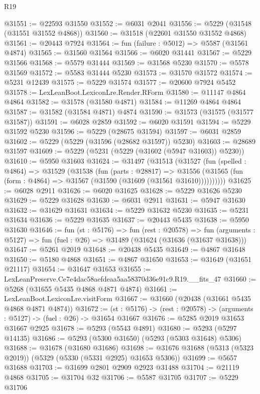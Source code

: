 \begin{lexlean}{R19}
\begin{coremodule}
@31551 := @22593 @31550
@31552 := @6031 @2041
@31556 := @5229 (@31548 (@31551 @31552 @4868))
@31560 := @31518 (@22601 @31550 @31552 @4868)
@31561 := @20443 @7924
@31564 := fun (failure : @5012) => @5587 (@31561 @4874)
@31565 := @31560 @31564
@31566 := @6020 @31441
@31567 := @5229 @31566
@31568 := @5579 @31444
@31569 := @31568 @5230
@31570 := @5578 @31569
@31572 := @5583 @31444 @5230
@31573 := @31570 @31572
@31574 := @5231 @12439
@31575 := @5229 @31574
@31577 := @20600 @7924 @5452
@31578 := LexLeanBoot.LexiconLre.Render.RForm
@31580 := @11147 @4864 @4864
@31582 := @31578 (@31580 @4871)
@31584 := @11269 @4864 @4864
@31587 := @31582 (@31584 @4871) @4874
@31590 := @31573 (@31575 (@31577 @31587))
@31591 := @6028 @2859
@31592 := @6020 @31591
@31594 := @5229 @31592 @5230
@31596 := @5229 (@28675 @31594)
@31597 := @6031 @2859
@31602 := @5229 (@5229 (@31596 (@28682 @31597)) @5230)
@31603 := @28689 @31597
@31609 := @5229 (@5231 (@5229 (@31602 (@5947 @31603)) @5230))
@31610 := @5950 @31603
@31624 := @31497
    (@31513
      (@31527
        (fun (spelled : @4864) =>
        @31529
          (@31538
            (fun (parts : @28817) =>
            @31556 (@31565 (fun (form : @4864) => @31567 (@31590 (@31609 (@31561 @31610))))))))))
@31625 := @6028 @2911
@31626 := @6020 @31625
@31628 := @5229 @31626 @5230
@31629 := @5229 @31628
@31630 := @6031 @2911
@31631 := @5947 @31630
@31632 := @31629 @31631
@31634 := @5229 @31632 @5230
@31635 := @5231 @31634
@31636 := @5229 @31635
@31637 := @20443 @5435
@31638 := @5950 @31630
@31646 := fun (st : @5176) =>
  fun (rest : @20578) =>
  fun (arguments : @5127) => fun (fuel : @26) => @31489 (@31624 (@31636 (@31637 @31638)))
@31647 := @5261 @2019
@31648 := @20438 @5435
@31649 := @4867 @31648
@31650 := @5180 @4868
@31651 := @4867 @31650
@31653 := @31649 (@31651 @21117)
@31654 := @31647 @31653
@31655 := LexLeanPreserve.Ce7e4dac58aefdeaa5aa58370d36e91c9.R19.__fits_47
@31660 := @5268 (@31655 @5435 @4868 @4871 @4874)
@31661 := LexLeanBoot.LexiconLre.visitForm
@31667 := @31660 (@20438 (@31661 @5435 @4868 @4871 @4874))
@31672 := (st : @5176) -> (rest : @20578) -> (arguments : @5127) -> (fuel : @26) -> @31654 @31667
@31676 := @5285 @2019 @31653 @31667 @2925
@31678 := @5293 (@5543 @4891)
@31680 := @5293 (@5297 @14135)
@31686 := @5293 (@5300 @31650) (@5293 (@5303 @31648) @5306)
@31688 := @31678 (@31680 @31686)
@31698 := @31676 @31688 (@5313 (@5323 @2019)) (@5329 (@5330 (@5331 @2925) @31653 @5306))
@31699 := @5657 @31688
@31703 := @31699 @2801 @2909 @2923 @31488
@31704 := @21119 @4868
@31705 := @31704 @32
@31706 := @5587 @31705
@31707 := @5229 @31706

\end{coremodule}
\end{lexlean}
